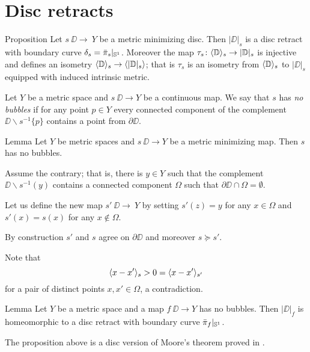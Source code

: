\section{Disc retracts}\label{Metric minimizing discs}

\begin{thm}{Proposition}\label{prop:|D|}
Let $s\:\DD\to\ Y$ be a metric minimizing disc.
Then $|\DD|_s$ is a disc retract with boundary curve $\delta_s=\bar\pi_s|_{\mathbb{S}^1}$.
Moreover the map $\tau_s\colon\langle\mathbb{D}\rangle_s\to |\mathbb{D}|_s$ is injective and defines an isometry
$\langle\mathbb{D}\rangle_s\to \langle|\mathbb{D}|_s\rangle$;
that is $\tau_s$ is an isometry from $\langle\mathbb{D}\rangle_s$ to $|\DD|_s$ equipped with induced intrinsic metric.
\end{thm}

Let $Y$ be a metric space and
$s\:\DD\to Y$ be a continuous map.
We say that $s$ has \label{page:no-bubble}\emph{no bubbles}
if for any point $p\in Y$ every connected component of the complement $\DD\backslash s^{-1}\{p\}$ contains a point from $\partial \DD$.

\begin{thm}{Lemma}\label{prop:point-complement}
Let $Y$ be metric spaces and $s\:\DD\to Y$ be a metric minimizing map.
Then $s$ has no bubbles.
\end{thm}

Assume the contrary;
that is, there is $y\in Y$ such that the complement $\DD\backslash s^{-1}(y)$ contains a connected component $\Omega$ such that $\partial \DD\cap \Omega=\emptyset$.

Let us define the new map $s'\:\DD\to\ Y$ by setting $s'(z)=y$ for any $x\in \Omega$ and $s'(x)=s(x)$ for any $x\notin \Omega$.

By construction $s'$ and $s$ agree on $\partial\DD$ and moreover $s\succcurlyeq s'$.

Note that
\[\langle x-x'\rangle_{s}>0=\langle x-x'\rangle_{s'}\]
for a pair of distinct points $x,x'\in \Omega$, a contradiction.
\qeds



\begin{thm}{Lemma}\label{prop:disc-moore}
Let $Y$ be a metric space and a map $f\:\DD\to Y$ has no bubbles.
Then $|\DD|_f$ is homeomorphic to a disc retract with boundary curve $\bar\pi_f|_{\mathbb{S}^1}$.
\end{thm}

The proposition above is a disc version of Moore's theorem \cite{moore} proved in \cite{LW3}.

